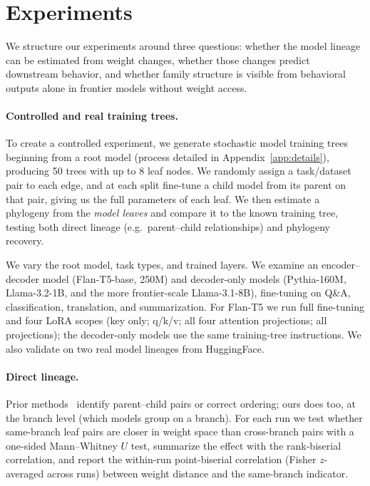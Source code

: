 \documentclass{article}
\theoremstyle{definition}
\theoremstyle{plain}
\begin{document}
\section{Experiments}
\label{sec:experiments}
We structure our experiments around three questions: whether the model lineage can be
estimated from weight changes, whether those changes predict downstream behavior, and
whether family structure is visible from behavioral outputs alone in
frontier models without weight access.

\paragraph{Controlled and real training trees.}
\label{sec:exp:trees}

To create a controlled experiment, we generate stochastic model training trees beginning from a root model (process detailed in Appendix~\ref{app:details}), producing 50 trees with up to 8 leaf nodes. We randomly assign a task/dataset pair to each edge, and at each split fine-tune a child model from its parent on that pair, giving us the full parameters of each leaf. We then estimate a phylogeny from the \textit{model leaves} and compare it to the known training tree, testing both direct lineage (e.g.\ parent--child relationships) and phylogeny recovery.

We vary the root model, task types, and trained layers. We examine an encoder--decoder model
(Flan-T5-base, 250M) and decoder-only models (Pythia-160M, Llama-3.2-1B, and the more frontier-scale
Llama-3.1-8B), fine-tuning on Q\&A, classification, translation, and summarization. For Flan-T5 we run
full fine-tuning and four LoRA \citep{hu2022lora} scopes (key only; q/k/v; all four attention
projections; all projections); the decoder-only models use the same training-tree instructions. We also
validate on two real model lineages from HuggingFace.

\paragraph{Direct lineage.}
Prior methods~\citep{horwitz2025mother, yu2025neural} identify parent--child pairs or correct ordering; ours does too, at the branch level (which models group on a branch). For each run we test whether same-branch leaf pairs are closer in weight space than cross-branch pairs with a one-sided Mann--Whitney $U$ test, summarize the effect with the rank-biserial correlation, and report the within-run point-biserial correlation (Fisher $z$-averaged across runs) between weight distance and the same-branch indicator.
\end{document}
